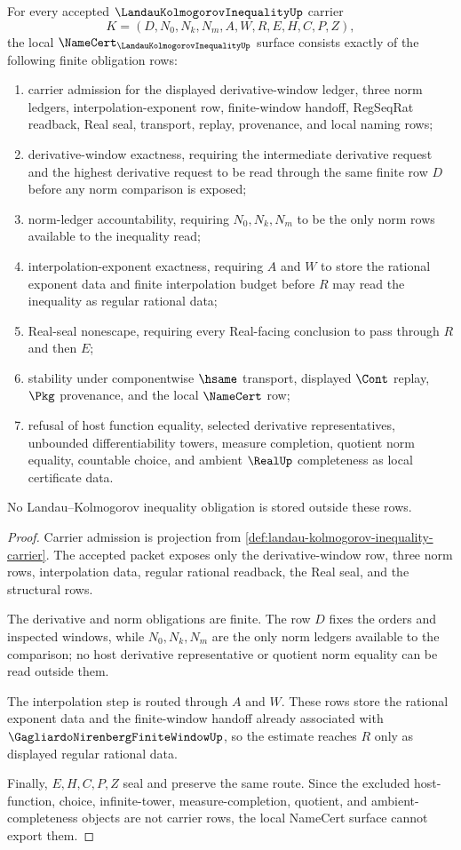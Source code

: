 \begin{theorem}
\label{thm:landau-kolmogorov-inequality-namecert-obligations}
For every accepted $\LandauKolmogorovInequalityUp$ carrier
$$
K=(D,N_0,N_k,N_m,A,W,R,E,H,C,P,Z),
$$
the local $\NameCert_{\LandauKolmogorovInequalityUp}$ surface consists exactly of the following finite obligation rows:
\begin{enumerate}
\item carrier admission for the displayed derivative-window ledger, three norm ledgers, interpolation-exponent row, finite-window handoff, RegSeqRat readback, Real seal, transport, replay, provenance, and local naming rows;
\item derivative-window exactness, requiring the intermediate derivative request and the highest derivative request to be read through the same finite row $D$ before any norm comparison is exposed;
\item norm-ledger accountability, requiring $N_0,N_k,N_m$ to be the only norm rows available to the inequality read;
\item interpolation-exponent exactness, requiring $A$ and $W$ to store the rational exponent data and finite interpolation budget before $R$ may read the inequality as regular rational data;
\item Real-seal nonescape, requiring every Real-facing conclusion to pass through $R$ and then $E$;
\item stability under componentwise $\hsame$ transport, displayed $\Cont$ replay, $\Pkg$ provenance, and the local $\NameCert$ row;
\item refusal of host function equality, selected derivative representatives, unbounded differentiability towers, measure completion, quotient norm equality, countable choice, and ambient $\RealUp$ completeness as local certificate data.
\end{enumerate}
No Landau--Kolmogorov inequality obligation is stored outside these rows.
\end{theorem}
\begin{proof}
Carrier admission is projection from \autoref{def:landau-kolmogorov-inequality-carrier}. The accepted packet exposes only the derivative-window row, three norm rows, interpolation data, regular rational readback, the Real seal, and the structural rows.

The derivative and norm obligations are finite. The row $D$ fixes the orders and inspected windows, while $N_0,N_k,N_m$ are the only norm ledgers available to the comparison; no host derivative representative or quotient norm equality can be read outside them.

The interpolation step is routed through $A$ and $W$. These rows store the rational exponent data and the finite-window handoff already associated with $\GagliardoNirenbergFiniteWindowUp$, so the estimate reaches $R$ only as displayed regular rational data.

Finally, $E,H,C,P,Z$ seal and preserve the same route. Since the excluded host-function, choice, infinite-tower, measure-completion, quotient, and ambient-completeness objects are not carrier rows, the local NameCert surface cannot export them.
\end{proof}

